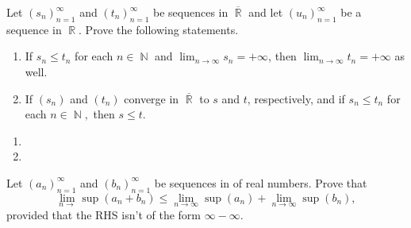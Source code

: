 \documentclass[12pt,letterpaper,boxed]{hmcpset}
\DeclareMathOperator{\N}{\mathbb{N}}
\DeclareMathOperator{\R}{\mathbb{R}}
\begin{document}
\begin{problem}[Exercise 4.2]
Let $(s_n)_{n=1}^{\infty}$ and $(t_n)_{n=1}^{\infty}$ be sequences in $\overline{\R}$ and let $(u_n)_{n=1}^{\infty}$ be a sequence in $\R$. Prove the following statements.
\vspace{-2mm}
    \begin{enumerate}
        \itemsep0em
        \item If $s_n \leq t_n$ for each $n\in\N$ and $\lim_{n\rightarrow \infty} s_n = + \infty$, then $\lim_{n\rightarrow \infty} t_n = + \infty$ as well.
        \item If $(s_n)$ and $(t_n)$ converge in $\overline{\R}$ to $s$ and $t$, respectively, and if $s_n \leq t_n$ for each $n\in\N,$ then $s \leq t.$
    \end{enumerate}
\end{problem}

\begin{solution}
\begin{enumerate}
        \itemsep0em
        \item 
        \item
    \end{enumerate}
\end{solution}

\begin{problem}[Exercise 4.2]
Let $(a_n)_{n=1}^{\infty}$ and $(b_n)_{n=1}^{\infty}$ be sequences in of real numbers. Prove that $$\lim_{n \rightarrow} \sup(a_n + b_n) \leq \lim_{n \rightarrow \infty} \sup(a_n) + \lim_{n \rightarrow \infty} \sup(b_n),$$ provided that the RHS isn't of the form $\infty - \infty$.
\end{problem}

\begin{solution}

\end{solution}
\end{document}
